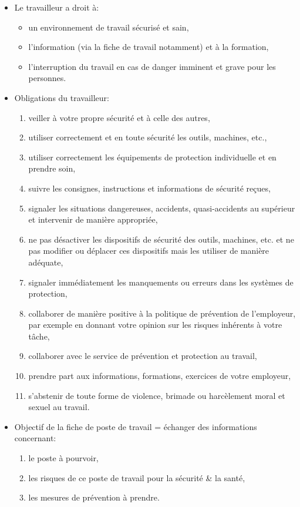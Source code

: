 \documentclass[a4paper]{article}
\begin{document}
\begin{itemize}
\item Le travailleur a droit à:
\begin{itemize}
    \item un environnement de travail sécurisé et sain,
    \item l'information (via la fiche de travail notamment) et à la formation,
    \item l'interruption du travail en cas de danger imminent et grave pour les personnes.
\end{itemize}





\item Obligations du travailleur:
\begin{enumerate}
    \item veiller à votre propre sécurité et à celle des autres,
    \item utiliser correctement et en toute sécurité les outils, machines, etc.,
    \item utiliser correctement les équipements de protection individuelle et en prendre soin,
    \item suivre les consignes, instructions et informations de sécurité reçues,
    \item signaler les situations dangereuses, accidents, quasi-accidents au supérieur et intervenir de manière appropriée,
    \item ne pas désactiver les dispositifs de sécurité des outils, machines, etc. et ne pas modifier ou déplacer ces dispositifs mais les utiliser de manière adéquate,
    \item signaler immédiatement les manquements ou erreurs dans les systèmes de protection,
    \item collaborer de manière positive à la politique de prévention de l’employeur, par exemple en donnant votre opinion sur les risques inhérents à votre tâche,
    \item collaborer avec le service de prévention et protection au travail,
    \item prendre part aux informations, formations, exercices de votre employeur,
    \item s'abstenir de toute forme de violence, brimade ou harcèlement moral et sexuel au travail.
\end{enumerate}





\item Objectif de la fiche de poste de travail = échanger des informations concernant:
\begin{enumerate}
    \item le poste à pourvoir,
    \item les risques de ce poste de travail pour la sécurité \& la santé,
    \item les mesures de prévention à prendre.
\end{enumerate}





\end{itemize}
\end{document}
